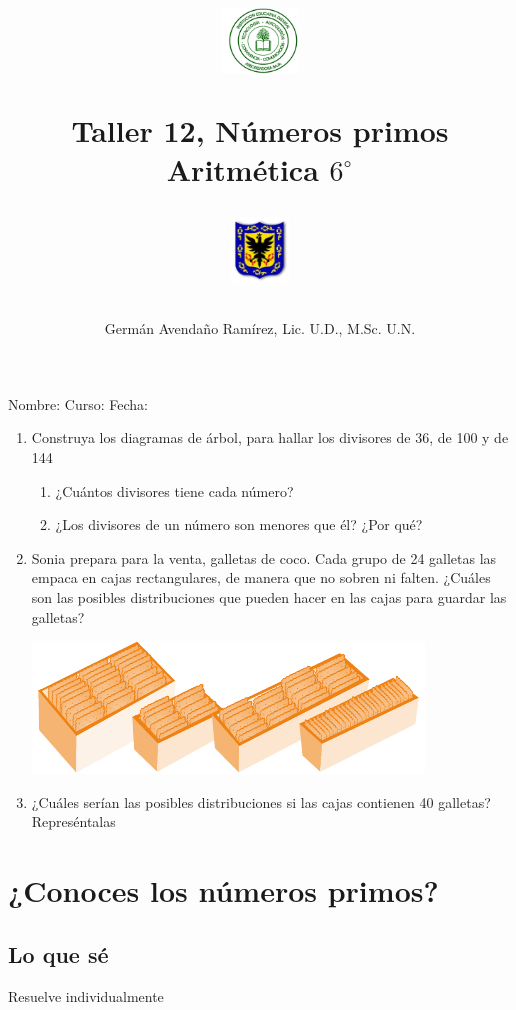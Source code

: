 \documentclass[10pt,twoside]{article}
\author{Germ\'an Avenda\~no Ram\'irez, Lic. U.D., M.Sc. U.N.}
\title{\begin{minipage}{.2\textwidth}
\includegraphics[height=1.75cm]{Images/logo-colegio.png}\end{minipage}
\begin{minipage}{.55\textwidth}
\begin{center}
Taller 12, Números primos  \\
Aritmética $6^{\circ}$
\end{center}
\end{minipage}\hfill
\begin{minipage}{.2\textwidth}
\includegraphics[height=1.75cm]{Images/logo-sed.png} 
\end{minipage}}
\date{}
\begin{document}
\maketitle
Nombre: \hrulefill Curso: \underline{\hspace*{44pt}} Fecha: \underline{\hspace*{2.5cm}}\\
\begin{enumerate}
 \item Construya los diagramas de árbol, para hallar los divisores de 36, de 100 y de 144
 \begin{enumerate}
  \item ¿Cuántos divisores tiene cada número?
  \item ¿Los divisores de un número son menores que él? ¿Por qué?
 \end{enumerate}
\item Sonia prepara para la venta, galletas de coco. Cada grupo de 24 galletas las empaca en cajas rectangulares, de manera que no sobren ni falten. ¿Cuáles son las posibles distribuciones que pueden hacer en las cajas para guardar las galletas?
\begin{center}
 \includegraphics{./Images/galletas.png}
\end{center}
\item  ¿Cuáles serían las posibles distribuciones si las cajas contienen
40 galletas? Represéntalas
\end{enumerate}
\section*{¿Conoces los números primos?}
\subsection*{Lo que sé}
Resuelve individualmente
\end{document}
